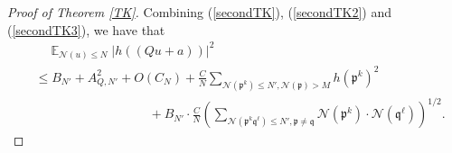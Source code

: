 \documentclass[11pt]{amsart}
\theoremstyle{definition}
\DeclareMathOperator*{\E}{\mathbb{E}}
\newcommand{\NN}{{\mathcal N}}
\newcommand{\mf}{\mathfrak}
\begin{document}
\begin{proof}[Proof of Theorem \ref{TK}]
Combining (\ref{secondTK}), (\ref{secondTK2}) and (\ref{secondTK3}), we have that
\begin{equation}\label{secondTK0}
    \begin{split}
        &\quad \E_{\NN(u) \leq N}\vert h((Qu+a))\vert^{2}
        \\&\leq %
        B_{N'}+A_{Q,N'}^{2}+O(C_{N})+\frac{C}{N}\sum_{\NN(\mf p^{k})\leq N', \NN(\mf p)>M}h(\mf p^{k})^{2}
        \\&
        \quad\quad\quad\quad\quad\quad\quad\quad\quad+B_{N'}\cdot\frac{C}{N}\left(\sum_{\NN(\mf p^{k}\mf q^{\ell})\leq N', \mf p\neq \mf q} \NN(\mf p^{k})\cdot \NN(\mf q^{\ell})\right)^{1/2}.
    \end{split}
\end{equation}   

\end{proof}
\end{document}

